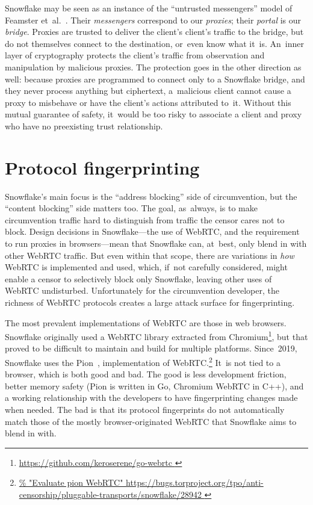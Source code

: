 \documentclass[letterpaper,twocolumn]{article}
\newcommand{\firstterm}[1]{\textit{#1}}
\newlength{\urlfootnotesize}
\newcommand{\urlfootnote}[1]{\footnote{
\raggedright\hangindent\footnotemargin%
\fontsize{\urlfootnotesize}{\urlfootnotesize}\selectfont%
\url{#1}
}}
\begin{document}
Snowflake may be seen as an instance of the
``untrusted messengers'' model of Feamster et~al.~\cite[\S 3]{Feamster2003a}.
Their \firstterm{messengers} correspond to our \firstterm{proxies};
their \firstterm{portal} is our \firstterm{bridge}.
Proxies are trusted to deliver the client's client's traffic to the bridge,
but do not themselves connect to the destination, or~even know what it~is.
An~inner layer of cryptography protects the client's traffic
from observation and manipulation by malicious proxies.
The protection goes in the other direction as well:
because proxies are programmed to connect only to a Snowflake bridge,
and they never process anything but ciphertext,
a~malicious client cannot cause a proxy to misbehave
or have the client's actions attributed to~it.
Without this mutual guarantee of safety,
it~would be too risky to associate a client and proxy
who have no preexisting trust relationship.

\section{Protocol fingerprinting}
\label{sec:fingerprinting}


Snowflake's main focus is the ``address blocking'' side of circumvention,
but the ``content blocking'' side matters too.
The goal, as~always, is to make circumvention traffic
hard to distinguish from traffic the censor cares not to block.
Design decisions in Snowflake---the use of WebRTC,
and the requirement to run proxies in browsers---mean
that Snowflake can, at~best, only blend in with other WebRTC traffic.
But even within that scope,
there are variations in \emph{how}
WebRTC is implemented and used,
which, if~not carefully considered, might enable a censor
to selectively block only Snowflake,
leaving other uses of WebRTC undisturbed.
Unfortunately for the circumvention developer,
the richness of WebRTC protocols
creates a large attack surface for fingerprinting.

The most prevalent implementations of WebRTC are those in web browsers.
Snowflake originally used a WebRTC library extracted from Chromium\urlfootnote{
https://github.com/keroserene/go-webrtc
},
but that proved to be difficult to maintain
and build for multiple platforms.
Since~2019, Snowflake uses the Pion~\cite{pion-webrtc},
implementation of WebRTC.\urlfootnote{
https://bugs.torproject.org/tpo/anti-censorship/pluggable-transports/snowflake/28942
}
It~is not tied to a browser,
which is both good and bad.
The good is less development friction,
better memory safety
(Pion is written in Go, Chromium WebRTC in C++),
and a working relationship with the developers
to have fingerprinting changes made when needed.
The bad is that its protocol fingerprints
do not automatically match those of the mostly browser-originated
WebRTC that Snowflake aims to blend in with.
\end{document}
